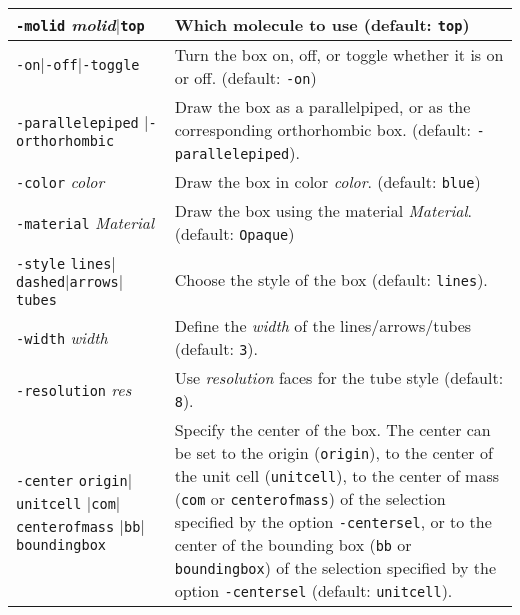 \documentclass[a4paper, DIV12]{scrartcl}
\begin{document}
\begin{tabular}{|p{}|p{}|}
\hline

\texttt{-molid} \textit{molid}$|$\texttt{top}
& Which molecule to use (default: \texttt{top})
\\ \hline

\texttt{-on}$|$\texttt{-off}$|$\texttt{-toggle}
& Turn the box on, off, or toggle whether it is on or off. (default:
\texttt{-on})
\\ \hline

\texttt{-parallelepiped} $|$\texttt{-orthorhombic}
& Draw the box as a parallelpiped, or as the corresponding
orthorhombic box. (default: \texttt{-parallelepiped}).
\\ \hline

\texttt{-color} \textit{color}
& Draw the box in color \textit{color}. (default: \texttt{blue})
\\ \hline

\texttt{-material} \textit{Material}
& Draw the box using the material \textit{Material}. (default: \texttt{Opaque})
\\ \hline


\texttt{-style}
\texttt{lines}$|$\texttt{dashed}$|$\texttt{arrows}$|$\texttt{tubes}
& Choose the style of the box (default: \texttt{lines}).
\\ \hline

\texttt{-width} \textit{width}
& Define the \textit{width} of the lines/arrows/tubes (default:
\texttt{3}). 
\\ \hline

\texttt{-resolution} \textit{res}
& Use \textit{resolution} faces for the tube style (default:
\texttt{8}).
\\ \hline

\texttt{-center} \texttt{origin}$|$\texttt{unitcell}\linebreak
\hspace*{1em}$|$\texttt{com}$|$\texttt{centerofmass}\linebreak 
\hspace*{1em}$|$\texttt{bb}$|$\texttt{boundingbox}
& Specify the center of the box. The center can be set to
the origin (\texttt{origin}), to the center of the unit cell
(\texttt{unitcell}), to the center of mass (\texttt{com} or
\texttt{centerofmass}) of the selection specified by the option
\texttt{-centersel}, or to the center of the bounding box (\texttt{bb}
or \texttt{boundingbox}) of the selection specified by the option
\texttt{-centersel} (default: \texttt{unitcell}).
\\ \hline


\end{tabular}
\end{document}
